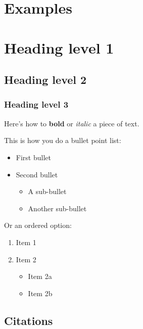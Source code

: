\documentclass[]{elsarticle} %
\providecommand{\tightlist}{%
  \setlength{\itemsep}{0pt}\setlength{\parskip}{0pt}}
\theoremstyle{definition}
\theoremstyle{definition}
\theoremstyle{definition}
\theoremstyle{remark}
\begin{document}
\hypertarget{examples}{%
\section{Examples}\label{examples}}

\hypertarget{heading-level-1}{%
\section{Heading level 1}\label{heading-level-1}}

\hypertarget{heading-level-2}{%
\subsection{Heading level 2}\label{heading-level-2}}

\hypertarget{heading-level-3}{%
\subsubsection{Heading level 3}\label{heading-level-3}}

Here's how to \textbf{bold} or \emph{italic} a piece of text.

This is how you do a bullet point list:

\begin{itemize}
\tightlist
\item
  First bullet
\item
  Second bullet

  \begin{itemize}
  \tightlist
  \item
    A sub-bullet
  \item
    Another sub-bullet
  \end{itemize}
\end{itemize}

Or an ordered option:

\begin{enumerate}
\def\labelenumi{\arabic{enumi}.}
\tightlist
\item
  Item 1
\item
  Item 2

  \begin{itemize}
  \tightlist
  \item
    Item 2a
  \item
    Item 2b
  \end{itemize}
\end{enumerate}

\hypertarget{citations}{%
\subsection{Citations}\label{citations}}
\end{document}
